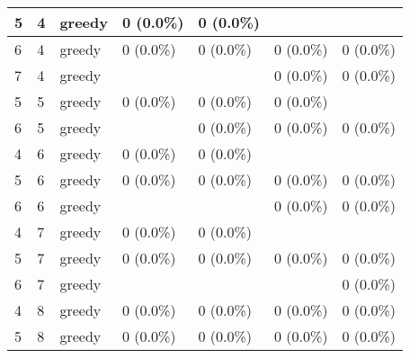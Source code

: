 \documentclass[oneside,canadian,landscape]{article}
\begin{document}
\begin{center}
\begin{longtable}{|l|l|l||l|l|l|l|}
5&4&greedy&0 (0.0\%)&0 (0.0\%)&&\\ \hline
6&4&greedy&0 (0.0\%)&0 (0.0\%)&0 (0.0\%)&0 (0.0\%)\\ \hline
7&4&greedy&&&0 (0.0\%)&0 (0.0\%)\\ \hline
5&5&greedy&0 (0.0\%)&0 (0.0\%)&0 (0.0\%)&\\ \hline
6&5&greedy&&0 (0.0\%)&0 (0.0\%)&0 (0.0\%)\\ \hline
4&6&greedy&0 (0.0\%)&0 (0.0\%)&&\\ \hline
5&6&greedy&0 (0.0\%)&0 (0.0\%)&0 (0.0\%)&0 (0.0\%)\\ \hline
6&6&greedy&&&0 (0.0\%)&0 (0.0\%)\\ \hline
4&7&greedy&0 (0.0\%)&0 (0.0\%)&&\\ \hline
5&7&greedy&0 (0.0\%)&0 (0.0\%)&0 (0.0\%)&0 (0.0\%)\\ \hline
6&7&greedy&&&&0 (0.0\%)\\ \hline
4&8&greedy&0 (0.0\%)&0 (0.0\%)&0 (0.0\%)&0 (0.0\%)\\ \hline
5&8&greedy&0 (0.0\%)&0 (0.0\%)&0 (0.0\%)&0 (0.0\%)\\ \hline
\end{longtable}
\end{center}
\end{document}
